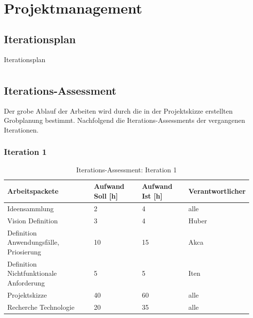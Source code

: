 \documentclass[11pt,ngerman]{article}
\begin{document}
    \section{Projektmanagement}

    \subsection{Iterationsplan}

    \begin{table}[H]
        \caption{Iterationsplan}
        \begin{tabularx}{\textwidth}{l l l l}
            \toprule
            \toprule
        \end{tabularx}
        \label{tab:Iterationsplan}
    \end{table}

    \subsection{Iterations-Assessment}
    Der grobe Ablauf der Arbeiten wird durch die in der Projektskizze erstellten Grobplanung bestimmt. Nachfolgend die Iterations-Assessments der vergangenen Iterationen.

    \subsubsection{Iteration 1}
    \begin{table}[H]
        \caption{Iterations-Assessment: Iteration 1}
        \begin{tabularx}{\textwidth}{l l l l}
            \toprule
            Arbeitspackete & Aufwand Soll [h] & Aufwand Ist [h] & Verantwortlicher \\
            \toprule
            Ideensammlung & 2 & 4 & alle \\
            Vision Definition & 3 & 4 & Huber \\
            Definition Anwendungsfälle, Priosierung & 10 & 15 & Akca \\
            Definition Nichtfunktionale Anforderung & 5 & 5 & Iten \\
            Projektskizze & 40 & 60 & alle \\
            Recherche Technologie & 20 & 35 & alle \\
            \bottomrule
        \end{tabularx}
        \label{tab:Iterations-Assessment: Iteration 1}
    \end{table}
\end{document}
